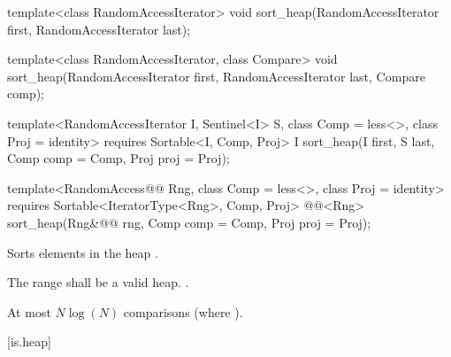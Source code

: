 %
\begin{removedblock}
\begin{itemdecl}
template<class RandomAccessIterator>
  void sort_heap(RandomAccessIterator first, RandomAccessIterator last);

template<class RandomAccessIterator, class Compare>
  void sort_heap(RandomAccessIterator first, RandomAccessIterator last,
                 Compare comp);
\end{itemdecl}
\end{removedblock}
\begin{addedblock}
\begin{itemdecl}
template<RandomAccessIterator I, Sentinel<I> S, class Comp = less<>,
    class Proj = identity>
  requires Sortable<I, Comp, Proj>
  I sort_heap(I first, S last, Comp comp = Comp{}, Proj proj = Proj{});

template<RandomAccess@@ Rng, class Comp = less<>, class Proj = identity>
  requires Sortable<IteratorType<Rng>, Comp, Proj>
  @@<Rng>
    sort_heap(Rng&@\newtxt{\&}@ rng, Comp comp = Comp{}, Proj proj = Proj{});
\end{itemdecl}
\end{addedblock}

\begin{itemdescr}
\pnum
\effects
Sorts elements in the heap
.

\pnum
\requires The range  shall be a valid heap.
.

\begin{addedblock}
\pnum
\returns {}
\end{addedblock}

\pnum
\complexity
At most $N \log(N)$
comparisons (where
).
\end{itemdescr}

[is.heap]{}

